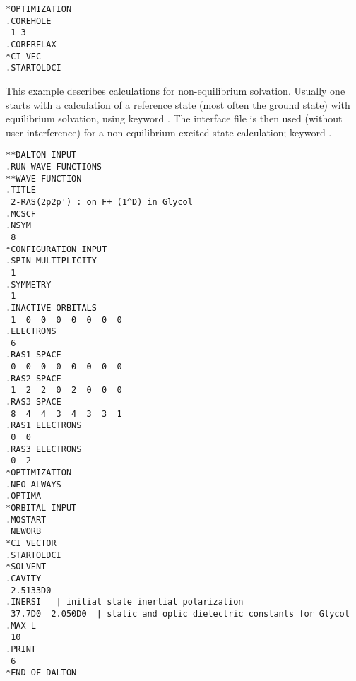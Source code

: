 \begin{verbatim}
*OPTIMIZATION
.COREHOLE
 1 3
.CORERELAX
*CI VEC
.STARTOLDCI
\end{verbatim}
\label{sirius_ex7}

\begin{center}
\end{center}

This example describes calculations for non-equilibrium
solvation. Usually one starts
with a calculation of a reference state (most often the ground
state) with equilibrium solvation, using keyword . The
interface file is then used (without user interference) for a
non-equilibrium excited state calculation; keyword .

\begin{verbatim}
**DALTON INPUT
.RUN WAVE FUNCTIONS
**WAVE FUNCTION
.TITLE
 2-RAS(2p2p') : on F+ (1^D) in Glycol
.MCSCF
.NSYM
 8
*CONFIGURATION INPUT
.SPIN MULTIPLICITY
 1
.SYMMETRY
 1
.INACTIVE ORBITALS
 1  0  0  0  0  0  0  0
.ELECTRONS
 6
.RAS1 SPACE
 0  0  0  0  0  0  0  0
.RAS2 SPACE
 1  2  2  0  2  0  0  0
.RAS3 SPACE
 8  4  4  3  4  3  3  1
.RAS1 ELECTRONS
 0  0
.RAS3 ELECTRONS
 0  2
*OPTIMIZATION
.NEO ALWAYS
.OPTIMA
*ORBITAL INPUT
.MOSTART
 NEWORB
*CI VECTOR
.STARTOLDCI
*SOLVENT
.CAVITY
 2.5133D0
.INERSI   | initial state inertial polarization
 37.7D0  2.050D0  | static and optic dielectric constants for Glycol
.MAX L
 10
.PRINT
 6
*END OF DALTON
\end{verbatim}
\label{sirius_ex8}

